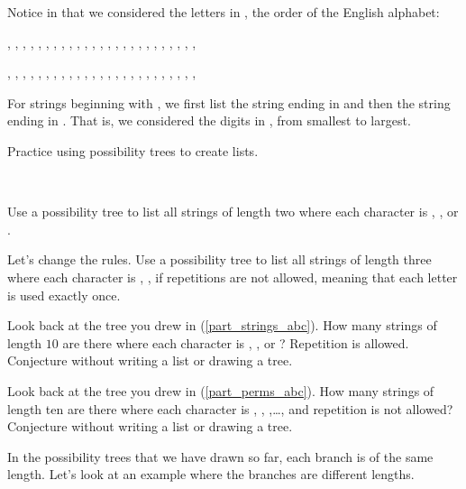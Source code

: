 Notice in  that we considered the letters in , the order of the English alphabet:
\begin{center}
    , , , , , , , , , , , , , , , , , , , , , , , , , 

    , , , , , , , , , , , , , , , , , , , , , , , , , 
\end{center}
For strings beginning with , we first list the string ending in  and then the string ending in .  That is, we considered the digits in , from smallest to largest.  

Practice using possibility trees to create lists.

\begin{act} 
\label{act_listing_strings}
    ~
    \begin{actpart}
        \item \label{part_strings_abc}Use a possibility tree to list all strings of length two where each character is , , or .
        \item \label{part_perms_abc} Let's change the rules. Use a possibility tree to list all strings of length three where each character is , ,  if repetitions are not allowed, meaning that each letter is used exactly once.
        \item  Look back at the tree you drew in (\ref{part_strings_abc}).  How many strings of length $10$ are there where each character is , , or ?  Repetition is allowed.  Conjecture without writing a list or drawing a tree.          
        \item  Look back at the tree you drew in (\ref{part_perms_abc}).  How many strings of length ten are there where each character is , , ,\ldots,  and repetition is not allowed?  Conjecture without writing a list or drawing a tree.  
    \end{actpart}
\end{act}

In the possibility trees that we have drawn so far, each branch is of the same length.  Let's look at an example where the branches are different lengths.

